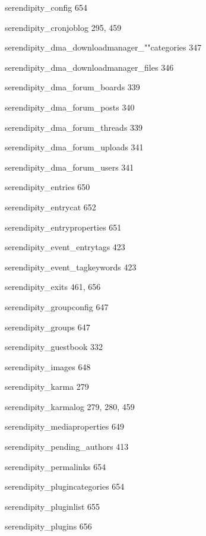 \documentclass{book}
\renewcommand\subitem{\par}
\begin{document}
\begin{multicols}{2}
\begin{osp-index}
    \subitem serendipity\_config\hspace{1mm} 654
    \subitem serendipity\_cronjoblog\hspace{1mm} 295, 459
    \subitem serendipity\_dma\_downloadmanager\_""categories\hspace{1mm} 
		347
    \subitem serendipity\_dma\_downloadmanager\_files\hspace{1mm} 346
    \subitem serendipity\_dma\_forum\_boards\hspace{1mm} 339
    \subitem serendipity\_dma\_forum\_posts\hspace{1mm} 340
    \subitem serendipity\_dma\_forum\_threads\hspace{1mm} 339
    \subitem serendipity\_dma\_forum\_uploads\hspace{1mm} 341
    \subitem serendipity\_dma\_forum\_users\hspace{1mm} 341
    \subitem serendipity\_entries\hspace{1mm} 650
    \subitem serendipity\_entrycat\hspace{1mm} 652
    \subitem serendipity\_entryproperties\hspace{1mm} 651
    \subitem serendipity\_event\_entrytags\hspace{1mm} 423
    \subitem serendipity\_event\_tagkeywords\hspace{1mm} 423
    \subitem serendipity\_exits\hspace{1mm} 461, 656
    \subitem serendipity\_groupconfig\hspace{1mm} 647
    \subitem serendipity\_groups\hspace{1mm} 647
    \subitem serendipity\_guestbook\hspace{1mm} 332
    \subitem serendipity\_images\hspace{1mm} 648
    \subitem serendipity\_karma\hspace{1mm} 279
    \subitem serendipity\_karmalog\hspace{1mm} 279, 280, 459
    \subitem serendipity\_mediaproperties\hspace{1mm} 649
    \subitem serendipity\_pending\_authors\hspace{1mm} 413
    \subitem serendipity\_permalinks\hspace{1mm} 654
    \subitem serendipity\_plugincategories\hspace{1mm} 654
    \subitem serendipity\_pluginlist\hspace{1mm} 655
    \subitem serendipity\_plugins\hspace{1mm} 656

\end{osp-index}
\end{multicols}
\end{document}
